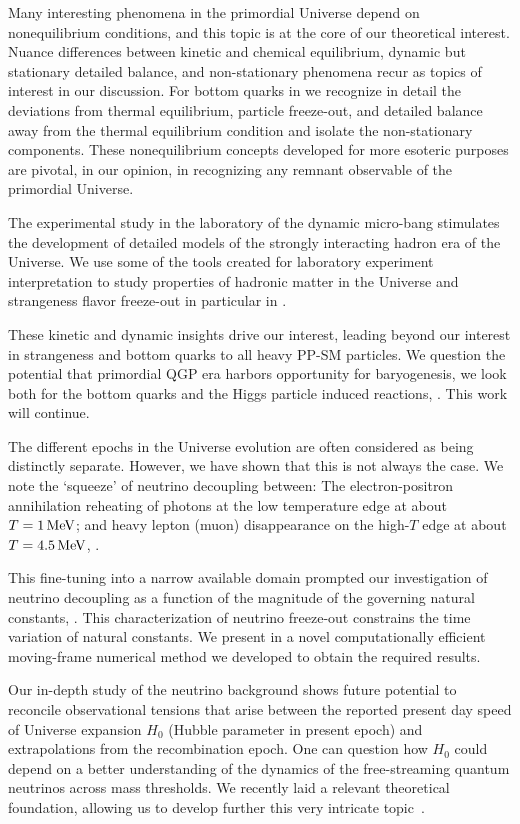 Many interesting phenomena in the primordial Universe depend on nonequilibrium conditions, and this topic is at the core of our theoretical interest. Nuance differences between kinetic and chemical equilibrium, dynamic but stationary detailed balance, and non-stationary phenomena recur as topics of interest in our discussion. For bottom quarks in  we recognize in detail the deviations from thermal equilibrium, particle freeze-out, and detailed balance away from the thermal equilibrium condition and isolate the non-stationary components. These nonequilibrium concepts developed for more esoteric purposes are pivotal, in our opinion, in recognizing any remnant observable of the primordial Universe. 

The experimental study in the laboratory of the dynamic micro-bang stimulates the development of detailed models of the strongly interacting hadron era of the Universe. We use some of the tools created for laboratory experiment interpretation to study properties of hadronic matter in the Universe and strangeness flavor freeze-out in particular in . 

These kinetic and dynamic insights drive our interest, leading beyond our interest in strangeness and bottom quarks to all heavy PP-SM particles. We question the potential that primordial QGP era harbors opportunity for baryogenesis, we look both for the bottom quarks and the Higgs particle induced reactions, . This work will continue.

The different epochs in the Universe evolution are often considered as being distinctly separate. However, we have shown that this is not always the case. We note the `squeeze' of neutrino decoupling between: The electron-positron annihilation reheating of photons at the low temperature edge at about $T=1\text{\,MeV}$; and heavy lepton (muon) disappearance on the high-$T$ edge at about $T=4.5\text{\,MeV}$, . 

This fine-tuning into a narrow available domain prompted our investigation of neutrino decoupling as a function of the magnitude of the governing natural constants, . This characterization of neutrino freeze-out constrains the time variation of natural constants. We present in  a novel computationally efficient moving-frame numerical method we developed to obtain the required results.

Our in-depth study of the neutrino background shows future potential to reconcile observational tensions that arise between the reported present day speed of Universe expansion $H_0$ (Hubble parameter in present epoch) and extrapolations from the recombination epoch. One can question how $H_0$ could depend on a better understanding of the dynamics of the free-streaming quantum neutrinos across mass thresholds. We recently laid a relevant theoretical foundation, allowing us to develop further this very intricate topic~\cite{Birrell:2024bdb}.

